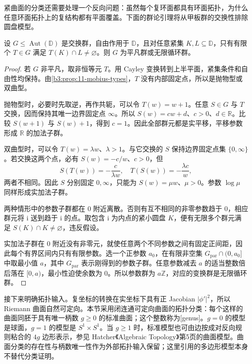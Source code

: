 \ProseParagraphBreak
紧曲面的分类还需要处理一个反向问题：虽然每个复环面都具有环面拓扑，为什么任意环面拓扑上的复结构都有平面覆盖。下面的群论引理将从甲板群的交换性排除圆盘模型。

\begin{lemma}[自由交换圆盘群]\label{b3:lem:12-abelian-disk-group}
设 \(G\le\operatorname{Aut}(\mathbb D)\) 是交换群，自由作用于 \(\mathbb D\)，且对任意紧集 \(K,L\subseteq\mathbb D\)，只有有限个 \(T\in G\) 满足 \(T(K)\cap L\ne\varnothing\)。则 \(G\) 为平凡群或无限循环群。
\end{lemma}
\begin{proof}
若 \(G\) 非平凡，取非恒等元 \(T\)。用 Cayley 变换转到上半平面，紧集条件和自由性均保持。由\cref{b3:prop:11-mobius-types}，\(T\) 没有内部固定点，所以是抛物型或双曲型。

抛物型时，必要时先取逆，再作共轭，可以令 \(T(w)=w+1\)。任意 \(S\in G\) 与 \(T\) 交换，因而保持其唯一边界固定点 \(\infty\)。所以 \(S(w)=cw+d\)、\(c>0\)、\(d\in\mathbb R\)。比较 \(S(w+1)\) 与 \(S(w)+1\)，得到 \(c=1\)。因此全部群元都是实平移，平移参数形成 \(\mathbb R\) 的加法子群。

双曲型时，可以令 \(T(w)=\lambda w\)、\(\lambda>1\)。与它交换的 \(S\) 保持边界固定点集 \(\{0,\infty\}\)。若交换这两个点，必有 \(S(w)=-c/w\)、\(c>0\)，但
\[
 S(T(w))=-\frac{c}{\lambda w},\quad
 T(S(w))=-\frac{\lambda c}{w},
\]
两者不相同。因此 \(S\) 分别固定 \(0,\infty\)，只能为 \(S(w)=\mu w\)、\(\mu>0\)。参数 \(\log\mu\) 同样形成实加法子群。

两种情形中的参数子群都在 \(0\) 附近离散。否则有互不相同的非零参数趋于 \(0\)，相应群元将 \(\mathrm i\) 送到趋于 \(\mathrm i\) 的点。取包含 \(\mathrm i\) 为内点的紧小圆盘 \(K\)，便有无限多个群元满足 \(S(K)\cap K\ne\varnothing\)，违反假设。

实加法子群在 \(0\) 附近没有非零元，就使任意两个不同参数之间有固定正间距，因此每个有界区间内只有有限参数。选一个正参数 \(a_0\)，在有限非空集 \(G_{\mathrm{par}}\cap(0,a_0]\) 中取最小值 \(a\)，其中 \(G_{\mathrm{par}}\) 表示刚得到的参数子群。任意参数减去 \(a\) 的适当整数倍后落在 \([0,a)\)，最小性迫使余数为 \(0\)。所以参数群为 \(a\mathbb Z\)，对应的变换群是无限循环群。
\end{proof}

接下来明确拓扑输入。复坐标的转换在实坐标下具有正 Jacobian \(|\phi'|^2\)，所以 Riemann 曲面自然可定向。本节采用闭连通可定向曲面的拓扑分类：每个这样的曲面同胚于具有唯一柄数 \(g\ge0\) 的标准曲面；这个整数称为[genus]。\(g=0\) 的模型是球面，\(g=1\) 的模型是 \(S^1\times S^1\)。当 \(g\ge1\) 时，标准模型也可由边按成对反向规则粘合的 \(4g\) 边形表示，参见 Hatcher《Algebraic Topology》第5页的曲面模型\cite[p.~5]{Hatcher2002Algebraic}。曲面分类的存在性与柄数唯一性作为外部拓扑输入保留；这里引用的多边形模型本身不替代分类证明。

